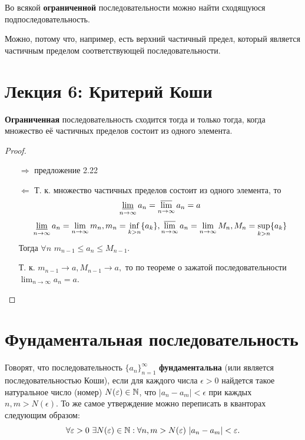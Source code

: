 	\begin{corollary}
		Во всякой \textbf{ограниченной} последовательности можно найти сходящуюся подпоследовательность.
	\end{corollary}
	
	Можно, потому что, например, есть верхний частичный предел, который является частичным пределом соответствующей последовательности.
	
	\newpage
	
	\section*{Лекция 6: Критерий Коши}
	
	\begin{theorem}
		\textbf{Ограниченная} последовательность сходится тогда и только тогда, когда множество её частичных пределов состоит из одного элемента.
	\end{theorem}
	
	\begin{proof}
		\begin{itemize}
			\item[$\Rightarrow$] предложение 2.22
			\item[$\Leftarrow$] Т. к. множество частичных пределов состоит из одного элемента, то
			\[ \operatorname*{\underline{lim}}_{n \to \infty} a_n = \operatorname*{\overline{lim}}_{n \to \infty} a_n = a \]
			\[ \operatorname*{\underline{lim}}_{n \to \infty} a_n = \lim_{n \to \infty} m_n, m_n = \inf_{k > n} \{a_k\}, \operatorname*{\overline{lim}}_{n \to \infty} a_n = \lim_{n \to \infty} M_n, M_n = \sup_{k > n} \{a_k\} \]
			Тогда $\forall n$ $m_{n - 1} \leqslant a_n \leqslant M_{n - 1}.$
			
			Т. к. $m_{n - 1} \to a, M_{n - 1} \to a,$ то по теореме о зажатой последовательности $\lim_{n \to \infty} a_n = a.$
		\end{itemize}
	\end{proof}
	
	\section{Фундаментальная последовательность}
	
	\begin{definition}
		Говорят, что последовательность $\{a_n\}^{\infty}_{n = 1}$ \textbf{фундаментальна} (или является последовательностью Коши), если для каждого числа $\epsilon > 0$ найдется такое натуральное число (номер) $N(\varepsilon) \in \mathbb N$, что $|a_n - a_m| < \epsilon$ при каждых $n, m > N(\epsilon).$ То же
		самое утверждение можно переписать в кванторах следующим образом:
		\[ \forall \varepsilon > 0 \text{ } \exists N(\varepsilon) \in \mathbb N : \forall n, m > N(\varepsilon) \text{ } |a_n - a_m| < \varepsilon. \]
	\end{definition}
	
